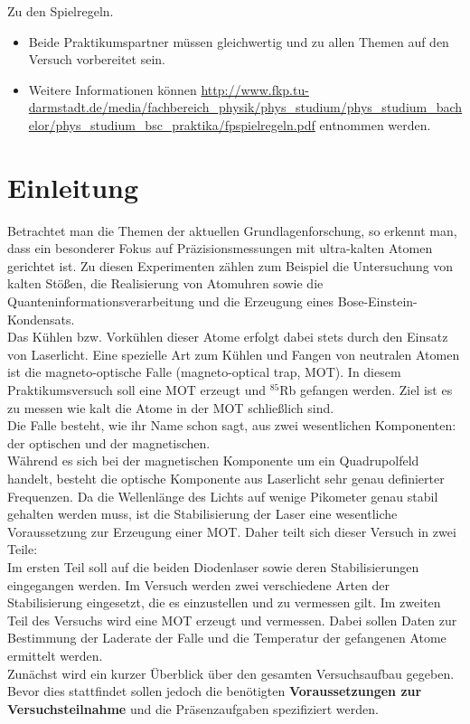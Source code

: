 \documentclass[
class=book,
accentcolor=1b,
custommargins=geometry,
fontsize=11pt,
thesis={type=Versuchsanleitung},
ruledheaders=all,
headline=false,
instbox=false,
marginpar=false,
title=small,
ignore-missing-data=true,
twoside=false,
pdfa=false %
]{apqpub}
\begin{document}
Zu den Spielregeln.

\begin{itemize}
	\item Beide Praktikumspartner müssen gleichwertig und zu allen Themen auf den Versuch vorbereitet sein.
	
	\item Weitere Informationen können \url{http://www.fkp.tu-darmstadt.de/media/fachbereich_physik/phys_studium/phys_studium_bachelor/phys_studium_bsc_praktika/fpspielregeln.pdf} entnommen werden.
\end{itemize}

\section{Einleitung}

Betrachtet man die Themen der aktuellen Grundlagenforschung, so erkennt man, dass ein besonderer Fokus auf
Präzisionsmessungen mit ultra-kalten Atomen gerichtet ist. Zu diesen Experimenten zählen zum Beispiel die Untersuchung von kalten Stößen, die Realisierung von Atomuhren sowie die Quanteninformationsverarbeitung und
die Erzeugung eines Bose-Einstein-Kondensats.\\
Das Kühlen bzw. Vorkühlen dieser Atome erfolgt dabei stets durch den Einsatz von Laserlicht. Eine spezielle Art
zum Kühlen und Fangen von neutralen Atomen ist die magneto-optische Falle (magneto-optical trap, MOT). In
diesem Praktikumsversuch soll eine MOT erzeugt und $^{85}$Rb gefangen werden. Ziel ist es zu messen wie kalt die
Atome in der MOT schließlich sind.\\
Die Falle besteht, wie ihr Name schon sagt, aus zwei wesentlichen Komponenten: der optischen und der magnetischen.\\
Während es sich bei der magnetischen Komponente um ein Quadrupolfeld handelt, besteht die optische Komponente
aus Laserlicht sehr genau definierter Frequenzen. Da die Wellenlänge des Lichts auf wenige Pikometer genau stabil
gehalten werden muss, ist die Stabilisierung der Laser eine wesentliche Voraussetzung zur Erzeugung einer MOT.
Daher teilt sich dieser Versuch in zwei Teile:\\
Im ersten Teil soll auf die beiden Diodenlaser sowie deren Stabilisierungen eingegangen werden. Im Versuch werden
zwei verschiedene Arten der Stabilisierung eingesetzt, die es einzustellen und zu vermessen gilt. Im zweiten
Teil des Versuchs wird eine MOT erzeugt und vermessen. Dabei sollen Daten zur Bestimmung der Laderate der
Falle und die Temperatur der gefangenen Atome ermittelt werden.\\
Zunächst wird ein kurzer Überblick über den gesamten Versuchsaufbau gegeben.\\ 
Bevor dies stattfindet sollen jedoch die benötigten \textbf{Voraussetzungen zur Versuchsteilnahme} und die Präsenzaufgaben spezifiziert werden. 
\end{document}
